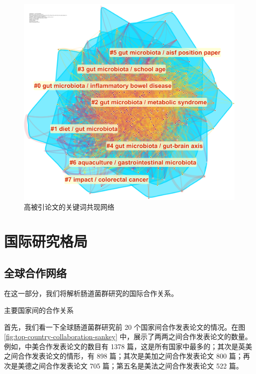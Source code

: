 \documentclass[]{ctexbook}
\begin{document}
\begin{figure}
\includegraphics[width=1\linewidth]{citespace/citespace-highlycited-keyword-network} \caption{高被引论文的关键词共现网络}\label{fig:citespace-highlycited-keyword-network}
\end{figure}

\hypertarget{part-ux56fdux9645ux7814ux7a76ux683cux5c40}{%
\part{国际研究格局}\label{part-ux56fdux9645ux7814ux7a76ux683cux5c40}}

\hypertarget{global}{%
\chapter{全球合作网络}\label{global}}

在这一部分，我们将解析肠道菌群研究的国际合作关系。

\hypertarget{htmlwidget-a80db2d4b22126c54edd}{}

\label{fig:top-country-collaboration-sankey}主要国家间的合作关系

首先，我们看一下全球肠道菌群研究前 20 个国家间合作发表论文的情况。在图 \ref{fig:top-country-collaboration-sankey} 中，展示了两两之间合作发表论文的数量。例如，中美合作发表论文的数目有 1378 篇，这是所有国家中最多的；其次是英美之间合作发表论文的情形，有 898 篇；其次是美加之间合作发表论文 800 篇；再次是美德之间合作发表论文 705 篇；第五名是美法之间合作发表论文 522 篇。
\end{document}
